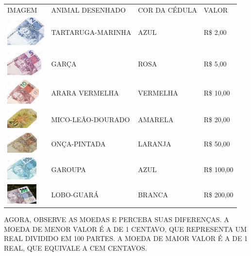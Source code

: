 {\begin{longtable}[]{@{}llll@{}}
\toprule
IMAGEM & ANIMAL DESENHADO & COR DA CÉDULA & VALOR\tabularnewline
\includegraphics[width=0.79592in,height=0.59694in]{media/image47.jpg} &
TARTARUGA-MARINHA & AZUL & R\$ 2,00\tabularnewline
\includegraphics[width=0.73274in,height=0.54956in]{media/image48.jpg} &
GARÇA & ROSA & R\$ 5,00\tabularnewline
\includegraphics[width=0.68163in,height=0.51122in]{media/image49.jpg} &
ARARA VERMELHA & VERMELHA & R\$ 10,00\tabularnewline
\includegraphics[width=0.63139in,height=0.41990in]{media/image50.jpg} &
MICO-LEÃO-DOURADO & AMARELA & R\$ 20,00\tabularnewline
\includegraphics[width=0.63326in,height=0.42114in]{media/image51.jpg} &
ONÇA-PINTADA & LARANJA & R\$ 50,00\tabularnewline
\includegraphics[width=0.62794in,height=0.47095in]{media/image52.jpg} &
GAROUPA & AZUL & R\$ 100,00\tabularnewline
\includegraphics[width=0.63126in,height=0.42104in]{media/image53.jpg} &
LOBO-GUARÁ & BRANCA & R\$ 200,00\tabularnewline
\bottomrule
\end{longtable}

AGORA, OBSERVE AS MOEDAS E PERCEBA SUAS DIFERENÇAS. A MOEDA DE MENOR VALOR É A DE 1 CENTAVO, QUE REPRESENTA UM REAL DIVIDIDO EM 100 PARTES. A MOEDA DE MAIOR VALOR É A DE 1 REAL, QUE EQUIVALE A CEM CENTAVOS.
}


